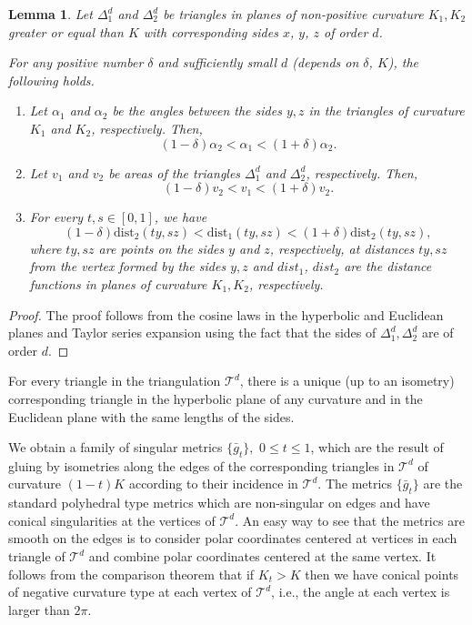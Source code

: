 \documentclass[12pt]{article}
\numberwithin{equation}{section}
\newtheorem{lem}{Lemma}[section]
\theoremstyle{definition}
\begin{document}
\begin{lem}\label{lem:comparison}
Let $\Delta^d_1$ and $\Delta^d_2$ be triangles  in planes of non-positive curvature $K_1, K_2$ greater or equal than $K$ with corresponding sides $x$, $y$, $z$ of order $d$.

For any positive number $\delta$ and sufficiently small $d$ (depends on $\delta$, $K$), the following holds.
\begin{enumerate}
\item Let $\alpha_1$ and $\alpha_2$ be the angles between the sides $y, z$ in the triangles of curvature $K_1$ and $K_2$, respectively. Then,
$$(1-\delta)\alpha_2<\alpha_1<(1+\delta)\alpha_2.$$
\item\label{2} Let $v_1$ and $v_2$ be areas of the triangles $\Delta^d_1$ and $\Delta^d_2$, respectively. Then,
$$(1-\delta)v_2<v_1<(1+\delta)v_2.$$
\item For every $t,s\in[0,1]$, we have
$$(1-\delta)\text{dist}_2(ty ,sz)< \text{dist}_1(ty,sz) <(1+\delta) \text{dist}_2(ty,sz),$$
where $ty, sz$ are points on the sides $y$ and $z$, respectively, at distances $ty, sz$ from the vertex formed by the sides $y,z$ and $dist_1$, $dist_2$ are the distance functions in planes of curvature $K_1, K_2$, respectively.
\end{enumerate}
\end{lem}
\begin{proof}
The proof follows from the cosine laws in the hyperbolic and Euclidean planes and Taylor series expansion using the fact that the sides of $\Delta^d_1, \Delta^d_2$ are of order $d$.
\end{proof}

For every triangle in the triangulation $\mathcal T^d$, there is a unique (up to  an isometry) corresponding triangle in the hyperbolic plane of any curvature and in the Euclidean plane with the same lengths of the sides. 

We obtain a family of singular metrics $\{\bar g_t\},\,\,0\le t\le1$,  which are the result of gluing by isometries along the edges of the corresponding triangles in $\mathcal T^d$ of curvature $(1-t)K$ according to their incidence in $\mathcal T^d$. The metrics $\{\bar g_t\}$ are the standard polyhedral type metrics which are non-singular on edges and have conical singularities at the vertices of $\mathcal T^d$. An easy way to see that the metrics are smooth on the edges is to consider polar coordinates centered at vertices in each triangle of $\mathcal T^d$ and combine polar coordinates centered at the same vertex. It follows from the comparison theorem that if $K_t>K$ then we have conical points of negative curvature type at each vertex of $\mathcal T^d$, i.e., the angle at each vertex is larger than $2\pi$. 
\end{document}
